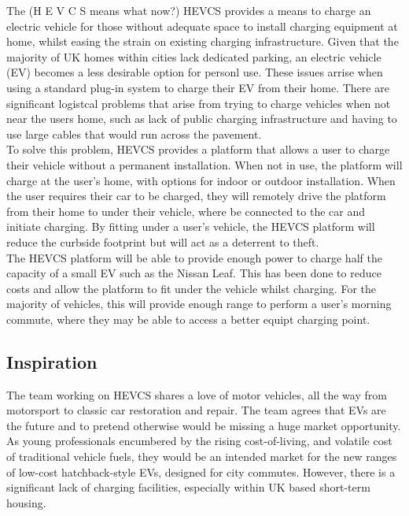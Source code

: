 \documentclass [12pt]{article}
\begin{document}
The (H E V C S means what now?) HEVCS provides a means to charge an electric vehicle for those without adequate space to install charging equipment at home, whilst easing the strain on existing charging infrastructure.
Given that the majority of UK homes within cities lack dedicated parking, an electric vehicle (EV) becomes a less desirable option for personl use.
These issues arrise when using a standard plug-in system to charge their EV from their home.
There are significant logistcal problems that arise from trying to charge vehicles when not near the users home, such as lack of public charging infrastructure and having to use large cables that would run across the pavement.
\\
To solve this problem, HEVCS provides a platform that allows a user to charge their vehicle without a permanent installation.
When not in use, the platform will charge at the user's home, with options for indoor or outdoor installation.
When the user requires their car to be charged, they will remotely drive the platform from their home to under their vehicle, where be connected to the car and initiate charging.
By fitting under a user's vehicle, the HEVCS platform will reduce the curbside footprint but will act as a deterrent to theft.
\\
The HEVCS platform will be able to provide enough power to charge half the capacity of a small EV such as the Nissan Leaf.
This has been done to reduce costs and allow the platform to fit under the vehicle whilst charging.
For the majority of vehicles, this will provide enough range to perform a user's morning commute, where they may be able to access a better equipt charging point.

\subsection{Inspiration}\label{sec:inspiration}

The team working on HEVCS shares a love of motor vehicles, all the way from motorsport to classic car restoration and repair.
The team agrees that EVs are the future and to pretend otherwise would be missing a huge market opportunity.
As young professionals encumbered by the rising cost-of-living, and volatile cost of traditional vehicle fuels, they would be an intended market for the new ranges of low-cost hatchback-style EVs, designed for city commutes.
However, there is a significant lack of charging facilities, especially within UK based short-term housing.
\end{document}
